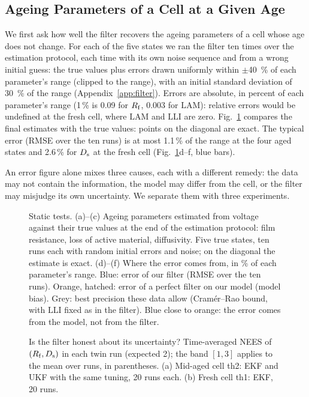 \documentclass[journal]{IEEEtran}
\newcommand{\LAM}{\mathrm{LAM}}\newcommand{\LLI}{\mathrm{LLI}}\newcommand{\phipl}{\phi_{\mathrm{pl}}}
\begin{document}
\subsection{Ageing Parameters of a Cell at a Given Age}\label{sec:ageing}
We first ask how well the filter recovers the ageing parameters of a cell whose age does not change. For each of the five states we ran the filter ten times over the estimation protocol, each time with its own noise sequence and from a wrong initial guess: the true values plus errors drawn uniformly within $\pm$\SI{40}{\percent} of each parameter's range (clipped to the range), with an initial standard deviation of \SI{30}{\percent} of the range (Appendix~\ref{app:filter}). Errors are absolute, in percent of each parameter's range (1\,\% is 0.09 for $R_{\mathrm{f}}$, 0.003 for $\LAM$): relative errors would be undefined at the fresh cell, where $\LAM$ and $\LLI$ are zero. Fig.~\ref{fig:mc} compares the final estimates with the true values: points on the diagonal are exact. The typical error (RMSE over the ten runs) is at most 1.1\,\% of the range at the four aged states and 2.6\,\% for $D_{\mathrm{s}}$ at the fresh cell (Fig.~\ref{fig:mc}d--f, blue bars).

An error figure alone mixes three causes, each with a different remedy: the data may not contain the information, the model may differ from the cell, or the filter may misjudge its own uncertainty. We separate them with three experiments.

\begin{figure}[t]
\centering

\caption{Static tests. (a)--(c) Ageing parameters estimated from voltage against their true values at the end of the estimation protocol: film resistance, loss of active material, diffusivity. Five true states, ten runs each with random initial errors and noise; on the diagonal the estimate is exact. (d)--(f) Where the error comes from, in \% of each parameter's range. Blue: error of our filter (RMSE over the ten runs). Orange, hatched: error of a perfect filter on our model (model bias). Grey: best precision these data allow (Cram\'er--Rao bound, with $\LLI$ fixed as in the filter). Blue close to orange: the error comes from the model, not from the filter.}
\label{fig:mc}
\end{figure}

\begin{figure}[t]
\centering

\caption{Is the filter honest about its uncertainty? Time-averaged NEES of $(R_{\mathrm{f}},D_{\mathrm{s}})$ in each twin run (expected 2); the band $[1,3]$ applies to the mean over runs, in parentheses. (a) Mid-aged cell th2: EKF and UKF with the same tuning, 20 runs each. (b) Fresh cell th1: EKF, 20 runs.}
\label{fig:nees}
\end{figure}
\end{document}
